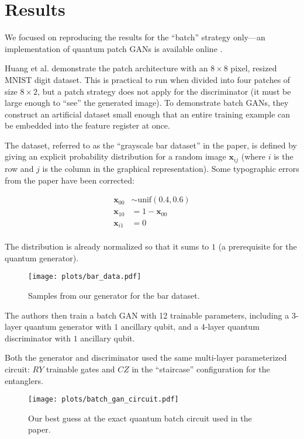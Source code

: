 \section{Results}
We focused on reproducing the results for the ``batch'' strategy only---an
implementation of quantum patch GANs is available online
\autocite{ellis2022quantum}.

Huang et al. demonstrate the patch architecture with an $8\times 8$ pixel, resized
MNIST digit dataset.  This is practical to run when divided into four patches of
size $8\times 2$, but a patch strategy does not apply for the discriminator (it must
be large enough to ``see'' the generated image).  To demonstrate batch GANs,
they construct an artificial dataset small enough that an entire training
example can be embedded into the feature register at once.

The dataset, referred to as the ``grayscale bar dataset'' in the paper, is
defined by giving an explicit probability distribution for a random image
$\bm{x}_{ij}$ (where $i$ is the row and $j$ is the column in the graphical
representation).  Some typographic errors from the paper have been corrected:

\begin{align*}
  \bm{x}_{00} &\sim \text{unif}(0.4, 0.6) \\
  \bm{x}_{10} &= 1 - \bm{x}_{00} \\
  \bm{x}_{i1} &= 0 \\
\end{align*}

The distribution is already normalized so that it sums to $1$ (a prerequisite
for the quantum generator).

\begin{figure}[H]
    \centering
    \texttt{[image: plots/bar\_data.pdf]}
    \caption{Samples from our generator for the bar dataset.}
    \label{fig:bar_data}
\end{figure}

The authors then train a batch GAN with 12 trainable parameters,
including a $3$-layer quantum generator with $1$ ancillary qubit, and
a $4$-layer quantum discriminator with $1$ ancillary qubit.

Both the generator and discriminator used the same multi-layer parameterized circuit: 
$RY$ trainable gates and $CZ$ in the ``staircase'' configuration for the entanglers.

\begin{figure}[H]
    \centering
    \texttt{[image: plots/batch\_gan\_circuit.pdf]}
    \caption{Our best guess at the exact quantum batch circuit used in the paper.}
    \label{fig:batch_gan_circuit}
\end{figure}

